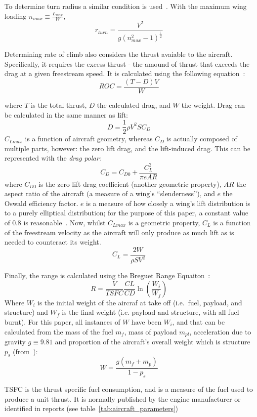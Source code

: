 \documentclass[../main.tex]{subfiles}
\begin{document}
To determine turn radius a similar condition is used~\cite{minTurnAndLift}.
With the maximum wing loading $n_{max} \equiv \frac{L_{max}}{W}$,
\[
    r_{turn} = \frac{V^{2}}{g \left(n_{max}^{2} - 1\right)^{\frac{1}{2}}}
\]

Determining rate of climb also considers the thrust avaiable to the aircraft.
Specifically, it requires the excess thrust - the amound of thrust that exceeds the drag at a given freestream speed.
It is calculated using the following equation~\cite{ROC}:
\[
    ROC = \frac{\left(T - D\right)V}{W}
\]

where $T$ is the total thrust, $D$ the calculated drag, and $W$ the weight.
Drag can be calculated in the same manner as lift:
\[
    D = \frac{1}{2}\rho V^{2} S C_{D}
\]
$C_{Lmax}$ is a function of aircraft geometry, whereas $C_{D}$ is actually composed of multiple parts, however: the zero lift drag, and the lift-induced drag.
This can be represented with the \textit{drag polar}:
\[
    C_{D} = C_{D0} + \frac{C_{L}^{2}}{\pi e AR}
\]
where $C_{D0}$ is the zero lift drag coefficient (another geometric property), $AR$ the aspect ratio of the aircraft (a measure of a wing's ``slenderness''), and $e$ the Oswald efficiency factor.
$e$ is a measure of how closely a wing's lift distribution is to a purely elliptical distribution; for the purpose of this paper, a constant value of 0.8 is reasonable~\cite{oswald}.
Now, whilst $C_{Lmax}$ is a geometric property, $C_{L}$ is a function of the freestream velocity as the aircraft will only produce as much lift as is needed to counteract its weight.
\[
    C_{L} = \frac{2 W}{\rho S V^{2}}
\]

Finally, the range is calculated using the Breguet Range Equaiton~\cite{RangeEqn}:
\[
    R = \frac{V}{TSFC} \frac{CL}{CD} \ln\left(\frac{W_{i}}{W_{f}}\right)
\]
Where $W_{i}$ is the initial weight of the aircraf at take off (i.e.\ fuel, payload, and structure) and $W_{f}$ is the final weight (i.e. payload and structure, with all fuel burnt).
For this paper, all instances of $W$ have been $W_{i}$, and that can be calculated from the mass of the fuel $m_{f}$, mass of payload $m_{pl}$, acceleration due to gravity $g\equiv 9.81$ and proportion of the aircraft's overall weight which is structure $p_{s}$ (from~\cite{Roskam1989}):
\[
    W = \frac{g(m_{f} + m_{p})}{1 - p_{s}}
\]

TSFC is the thrust specific fuel consumption, and is a measure of the fuel used to produce a unit thrust.
It is normally published by the engine manufacturer or identified in reports (see table~\ref{tab:aircraft_parameters})
\end{document}
